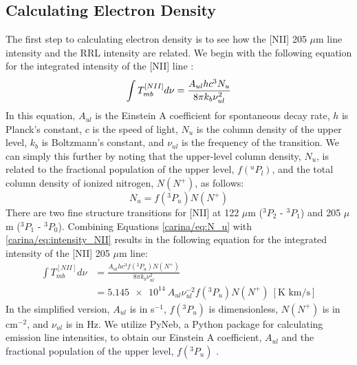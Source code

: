 \subsection{Calculating Electron Density}
The first step to calculating electron density is to see how the [NII] 205 $\mu$m line intensity and the RRL intensity are related.
We begin with the following equation for the integrated intensity of the [NII] line \parencite{pineda2019electron}:
\begin{equation}
    \label{carina/eq:intensity_NII}
    \int{T_{mb}^{[NII]}} d\nu = \frac{A_{ul}hc^3N_u}{8\pi k_b \nu_{ul}^2}\\
\end{equation}
In this equation, $A_{ul}$ is the Einstein A coefficient for spontaneous decay rate, $h$ is Planck's constant, $c$ is the speed of light, $N_u$ is the column density of the upper level, $k_b$ is Boltzmann's constant, and $\nu_{ul}$ is the frequency of the transition.
We can simply this further by noting that the upper-level column density, $N_u$, is related to the fractional population of the upper level, $f(^uP_l)$, and the total column density of ionized nitrogen, $N(N^+)$, as follows:
\begin{equation}
    N_u = f(^3P_u) N(N^+)
    \label{carina/eq:N_u}
\end{equation}
There are two fine structure transitions for [NII] at 122 $\mu$m ($^3P_2$ - $^3P_1$) and 205 $\mu$m ($^3P_1$ - $^3P_0$).
Combining Equations \ref{carina/eq:N_u} with \ref{carina/eq:intensity_NII} results in the following equation for the integrated intensity of the [NII] 205 $\mu$m line:
\begin{align}
    \int{T_{mb}^{[NII]}} d\nu &= \frac{A_{ul}hc^3f(^3P_u)N(N^+)}{8\pi k_b \nu_{ul}^2} \\
    &= \num{5.145e14}\ A_{ul}\nu_{ul}^{-2}f(^3P_u)N(N^+)\ [\text{K km/s}]
    \label{carina/eq:intensity_NII_final}
\end{align}
In the simplified version, $A_{ul}$ is in s$^{-1}$, $f(^3P_u)$ is dimensionless, $N(N^+)$ is in cm$^{-2}$, and $\nu_{ul}$ is in Hz.
We utilize PyNeb, a Python package for calculating emission line intensities, to obtain our Einstein A coefficient, $A_{ul}$ and the fractional population of the upper level, $f(^3P_u)$ \parencite{luridiana2015pyneb, froese2004breit,7288EL, tayal2011electron}.


